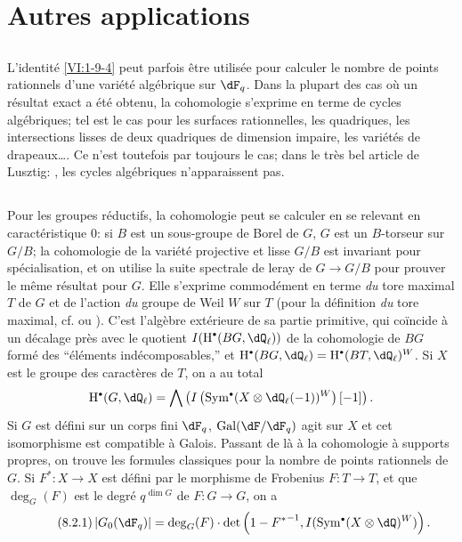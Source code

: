 \section{Autres applications}\label{VI:8}





\subsection{}\label{VI:8-1}

L'identit\'e \ref{VI:1-9-4} peut parfois \^etre utilis\'ee pour calculer 
le nombre de points rationnels d'une vari\'et\'e alg\'ebrique sur $\dF_q$. Dans 
la plupart des cas o\`u un r\'esultat exact a \'et\'e obtenu, la cohomologie 
s'exprime en terme de cycles alg\'ebriques; tel est le cas pour les surfaces 
rationnelles, les quadriques, les intersections lisses de deux quadriques de 
dimension impaire, les vari\'et\'es de drapeaux\ldots. Ce n'est toutefois par 
toujours le cas; dans le tr\`es bel article de Lusztig: \cite{lu76}, les cycles 
alg\'ebriques n'apparaissent pas. 





\subsection{}\label{VI:8-2}

Pour les groupes r\'eductifs, la cohomologie peut se calculer en se relevant en 
caract\'eristique $0$: si $B$ est un sous-groupe de Borel de $G$, $G$ est un 
$B$-torseur sur $G/B$; la cohomologie de la vari\'et\'e projective et lisse 
$G/B$ est invariant pour sp\'ecialisation, et on utilise la suite spectrale de 
leray de $G\to G/B$ pour prouver le m\^eme r\'esultat pour $G$. Elle s'exprime 
commod\'ement en terme \emph{du} tore maximal $T$ de $G$ et de l'action 
\emph{du} groupe de Weil $W$ sur $T$ (pour la d\'efinition \emph{du} tore 
maximal, cf. \cite[VIII \S 2 Rem.2]{bo05} ou \cite[p.105]{dl76}). C'est 
l'alg\`ebre ext\'erieure de sa partie primitive, qui coïncide \`a un d\'ecalage 
pr\`es avec le quotient $I(\h^\bullet(B G,\dQ_\ell))$ de la cohomologie de 
$B G$ form\'e des ``\'el\'ements ind\'ecomposables,'' et 
$\h^\bullet(B G,\dQ_\ell)=\h^\bullet(B T,\dQ_\ell)^W$. Si $X$ est le groupe des 
caract\`eres de $T$, on a au total 
\[
  \h^\bullet(G,\dQ_\ell) = \bigwedge \left(I\left(\operatorname{Sym}^\bullet(X\otimes \dQ_\ell(-1))^W\right)[-1]\right) \text{.}
\]
Si $G$ est d\'efini sur un corps fini $\dF_q$, $\gal(\dF/\dF_q)$ agit sur $X$ 
et cet isomorphisme est compatible \`a Galois. Passant de l\`a \`a la 
cohomologie \`a supports propres, on trouve les formules classiques pour la 
nombre de points rationnels de $G$. Si $F^\ast:X\to X$ est d\'efini par le 
morphisme de Frobenius $F:T\to T$, et que $\deg_G(F)$ est le degr\'e 
$q^{\dim G}$ de $F:G\to G$, on a 
\begin{equation*}\tag{8.2.1}\label{VI:eq:8-2-1}
  \left|G_0(\dF_q)\right| = \deg_G(F) \cdot \det\left(1-{F^\ast}^{-1},I(\operatorname{Sym}^\bullet(X\otimes \dQ)^W)\right) \text{.}
\end{equation*}

